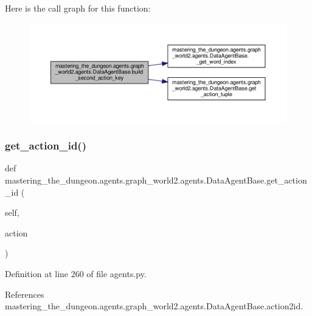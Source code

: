 Here is the call graph for this function\+:
\nopagebreak
\begin{figure}[H]
\begin{center}
\leavevmode
\includegraphics[width=350pt]{classmastering__the__dungeon_1_1agents_1_1graph__world2_1_1agents_1_1DataAgentBase_a7841fcde768420a09fe41f1bb9483774_cgraph}
\end{center}
\end{figure}
\mbox{\label{classmastering__the__dungeon_1_1agents_1_1graph__world2_1_1agents_1_1DataAgentBase_a94accb6ae4ab603baef4d081cf731a84}} 
\subsubsection{\texorpdfstring{get\+\_\+action\+\_\+id()}{get\_action\_id()}}
{\footnotesize\ttfamily def mastering\+\_\+the\+\_\+dungeon.\+agents.\+graph\+\_\+world2.\+agents.\+Data\+Agent\+Base.\+get\+\_\+action\+\_\+id (\begin{DoxyParamCaption}\item[{}]{self,  }\item[{}]{action }\end{DoxyParamCaption})}



Definition at line 260 of file agents.\+py.



References mastering\+\_\+the\+\_\+dungeon.\+agents.\+graph\+\_\+world2.\+agents.\+Data\+Agent\+Base.\+action2id.



